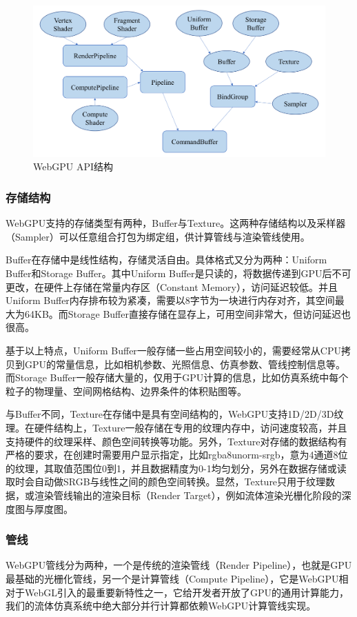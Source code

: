     \begin{figure}
    	\centering
    	\includegraphics[width=.75\textwidth]{figures/webgpu/api.png}
    	\caption{WebGPU API结构}
    \end{figure}

\subsubsection{存储结构}
    WebGPU支持的存储类型有两种，Buffer与Texture。这两种存储结构以及采样器（Sampler）可以任意组合打包为绑定组，供计算管线与渲染管线使用。
    
    Buffer在存储中是线性结构，存储灵活自由。具体格式又分为两种：Uniform Buffer和Storage Buffer。其中Uniform Buffer是只读的，将数据传递到GPU后不可更改，在硬件上存储在常量内存区（Constant Memory），访问延迟较低。并且Uniform Buffer内存排布较为紧凑，需要以8字节为一块进行内存对齐，其空间最大为64KB。而Storage Buffer直接存储在显存上，可用空间非常大，但访问延迟也很高。
    
    基于以上特点，Uniform Buffer一般存储一些占用空间较小的，需要经常从CPU拷贝到GPU的常量信息，比如相机参数、光照信息、仿真参数、管线控制信息等。而Storage Buffer一般存储大量的，仅用于GPU计算的信息，比如仿真系统中每个粒子的物理量、空间网格结构、边界条件的体积贴图等。
    
    与Buffer不同，Texture在存储中是具有空间结构的，WebGPU支持1D/2D/3D纹理。在硬件结构上，Texture一般存储在专用的纹理内存中，访问速度较高，并且支持硬件的纹理采样、颜色空间转换等功能。另外，Texture对存储的数据结构有严格的要求，在创建时需要用户显示指定，比如rgba8unorm-srgb，意为4通道8位的纹理，其取值范围位0到1，并且数据精度为0-1均匀划分，另外在数据存储或读取时会自动做SRGB与线性之间的颜色空间转换。显然，Texture只用于纹理数据，或渲染管线输出的渲染目标（Render Target），例如流体渲染光栅化阶段的深度图与厚度图。

\subsubsection{管线}
    WebGPU管线分为两种，一个是传统的渲染管线（Render Pipeline），也就是GPU最基础的光栅化管线，另一个是计算管线（Compute Pipeline），它是WebGPU相对于WebGL引入的最重要新特性之一，它给开发者开放了GPU的通用计算能力，我们的流体仿真系统中绝大部分并行计算都依赖WebGPU计算管线实现。
    
